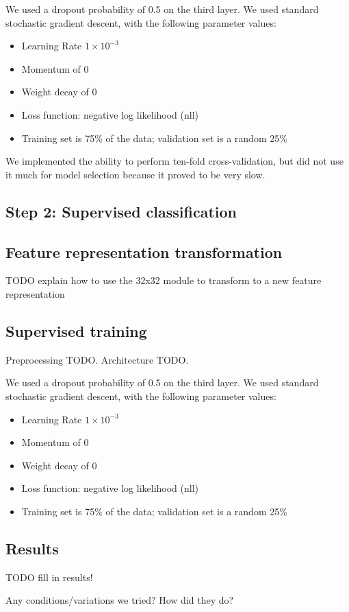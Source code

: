 \documentclass{article}
\newenvironment{itemizedense}{
\begin{itemize}
  \setlength{\itemsep}{1pt}
  \setlength{\parskip}{0pt}
  \setlength{\parsep}{0pt}
}{\end{itemize}}
\begin{document}
We used a dropout probability of 0.5 on the third layer. We used standard stochastic gradient descent, with the following parameter values:

\begin{itemizedense}
\item Learning Rate $1 \times 10^{-3}$
\item Momentum of $0$
\item Weight decay of $0$
\item Loss function: negative log likelihood (nll)
\item Training set is 75\% of the data; validation set is a random 25\%
\end{itemizedense}

We implemented the ability to perform ten-fold cross-validation, but did not use it much for model selection because it proved to be very slow.

\subsection*{Step 2: Supervised classification}

\subsection*{Feature representation transformation}

TODO explain how to use the 32x32 module to transform to a new feature representation

\subsection*{Supervised training}

Preprocessing TODO. Architecture TODO.

We used a dropout probability of 0.5 on the third layer. We used standard stochastic gradient descent, with the following parameter values:

\begin{itemizedense}
\item Learning Rate $1 \times 10^{-3}$
\item Momentum of $0$
\item Weight decay of $0$
\item Loss function: negative log likelihood (nll)
\item Training set is 75\% of the data; validation set is a random 25\%
\end{itemizedense}

\subsection*{Results}

TODO fill in results!

Any conditions/variations we tried? How did they do?
\end{document}
